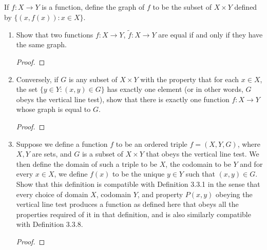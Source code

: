 \documentclass[../../main.tex]{subfiles}
\begin{document}
\subsection{}
\begin{q}
    If $f : X \to Y$ is a function, define the graph of $f$ to be the subset of $X \times Y$ defined by $\{(x, f(x)) : x \in X\}$.

        \begin{enumerate}
        \item Show that two functions $f : X \to Y$, $\tilde{f} : X \to Y$ are equal if and only if they have the same graph.
        \begin{proof}
            
        \end{proof}
        \begin{xx}
            
        \end{xx}

        \item Conversely, if $G$ is any subset of $X \times Y$ with the property that for each $x \in X$, the set $\{y \in Y : (x, y) \in G\}$ has exactly one element (or in other words, $G$ obeys the vertical line test), show that there is exactly one function $f : X \to Y$ whose graph is equal to $G$.
            
        \begin{proof}
            
        \end{proof}
        \begin{xx}
            
        \end{xx}

        \item Suppose we define a function $f$ to be an ordered triple $f = (X, Y, G)$, where $X, Y$ are sets, and $G$ is a subset of $X \times Y$ that obeys the vertical line test. We then define the domain of such a triple to be $X$, the codomain to be $Y$ and for every $x \in X$, we define $f(x)$ to be the unique $y \in Y$ such that $(x, y) \in G$. Show that this definition is compatible with Definition 3.3.1 in the sense that every choice of domain $X$, codomain $Y$, and property $P(x, y)$ obeying the vertical line test produces a function as defined here that obeys all the properties required of it in that definition, and is also similarly compatible with Definition 3.3.8.
            
        \begin{proof}
            
        \end{proof}
        \begin{xx}
            
        \end{xx}

        \end{enumerate}
\end{q}
\end{document}
